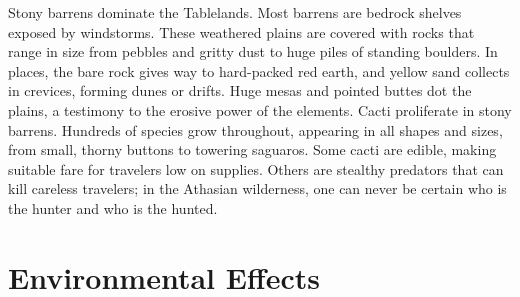\begin{multicols}{2}
Stony barrens dominate the Tablelands. Most barrens are bedrock shelves exposed
by windstorms. These weathered plains are covered with rocks that range in size
from pebbles and gritty dust to huge piles of standing boulders. In places,
the bare rock gives way to hard-packed red earth, and yellow sand collects in
crevices, forming dunes or drifts. Huge mesas and pointed buttes dot the plains,
a testimony to the erosive power of the elements. Cacti proliferate in stony
barrens. Hundreds of species grow throughout, appearing in all shapes and
sizes, from small, thorny buttons to towering saguaros. Some cacti are edible,
making suitable fare for travelers low on supplies. Others are stealthy
predators that can kill careless travelers; in the Athasian wilderness, one
can never be certain who is the hunter and who is the hunted.

\end{multicols}

\section{Environmental Effects}

